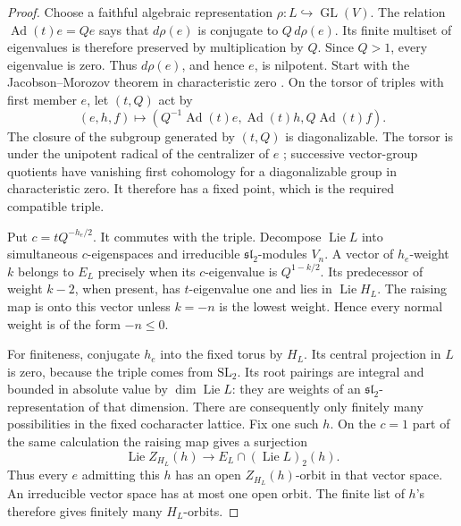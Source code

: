 \begin{proof}
Choose a faithful algebraic representation
$\rho:L\hookrightarrow\operatorname{GL}(V)$.
The relation $\operatorname{Ad}(t)e=Qe$ says that
$d\rho(e)$ is conjugate to $Q\,d\rho(e)$.
Its finite multiset of eigenvalues is therefore preserved by
multiplication by $Q$. Since $Q>1$, every eigenvalue is zero.
Thus $d\rho(e)$, and hence $e$, is nilpotent.
Start with the Jacobson--Morozov
theorem in characteristic zero
\cite[Theorems~3.1 and~3.2]{BMYJM}.
On the torsor of triples with first member $e$, let $(t,Q)$ act by
\[
 (e,h,f)\longmapsto
 (Q^{-1}\operatorname{Ad}(t)e,\operatorname{Ad}(t)h,
                  Q\operatorname{Ad}(t)f).
\]
The closure of the subgroup generated by $(t,Q)$ is diagonalizable.
The torsor is under the unipotent radical of the centralizer of $e$
\cite[Proposition~3.3]{BMYJM};
successive vector-group quotients have vanishing first cohomology
for a diagonalizable group in characteristic zero.  It therefore
has a fixed point, which is the required compatible triple.

Put $c=tQ^{-h_e/2}$.  It commutes with the triple.
Decompose $\operatorname{Lie}L$ into simultaneous $c$-eigenspaces
and irreducible $\mathfrak{sl}_2$-modules $V_n$.
A vector of $h_e$-weight $k$ belongs to $E_L$ precisely when its
$c$-eigenvalue is $Q^{1-k/2}$.
Its predecessor of weight $k-2$, when present, has $t$-eigenvalue
one and lies in $\operatorname{Lie}H_L$.
The raising map is onto this vector unless $k=-n$ is the lowest
weight.  Hence every normal weight is of the form $-n\leq0$.

For finiteness, conjugate $h_e$ into the fixed torus by $H_L$.
Its central projection in $L$ is zero, because the triple comes
from $\mathrm{SL}_2$.  Its root pairings are integral and bounded
in absolute value by $\dim\operatorname{Lie}L$: they are weights
of an $\mathfrak{sl}_2$-representation of that dimension.
There are consequently only finitely many possibilities in the
fixed cocharacter lattice.  Fix one such $h$.  On the $c=1$ part of the same calculation the
raising map gives a surjection
\[
 \operatorname{Lie}Z_{H_L}(h)
 \longrightarrow E_L\cap(\operatorname{Lie}L)_2(h).
\]
Thus every $e$ admitting this $h$ has an open
$Z_{H_L}(h)$-orbit in that vector space.  An irreducible vector
space has at most one open orbit.  The finite list of $h$'s
therefore gives finitely many $H_L$-orbits.
\end{proof}

